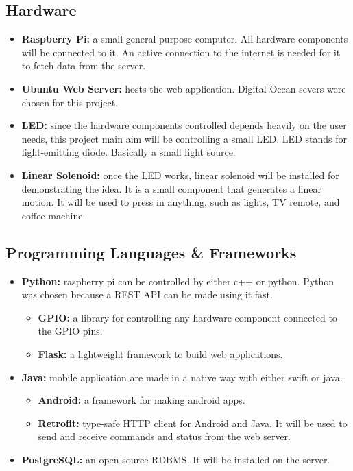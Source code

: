 \documentclass[12pt, oneside, a4paper]{book}
\newcommand\boldcolor[1]{\textcolor{bold}{\textbf{#1}}}
\begin{document}
			\subsection{Hardware}
				\begin{itemize}
				\item \boldcolor{Raspberry Pi:} a small general purpose computer. All hardware components will be connected to it. An active connection to the internet is needed for it to fetch data from the server. %
				\item \boldcolor{Ubuntu Web Server:} hosts the web application. Digital Ocean severs were chosen for this project.
				
				\item \boldcolor{LED:} since the hardware components controlled depends heavily on the user needs, this project main aim will be controlling a small LED. LED stands for light-emitting diode. Basically a small light source. %
				\item \boldcolor{Linear Solenoid:} once the LED works, linear solenoid will be installed for demonstrating the idea. It is a small component that generates a linear motion. It will be used to press in anything, such as lights, TV remote, and coffee machine. %
				\end{itemize}
				
			\subsection{Programming Languages \& Frameworks}
				\begin{itemize}
					
					\item \boldcolor{Python:} raspberry pi can be controlled by either c++ or python. Python was chosen because a REST API can be made using it fast.
		 				\begin{itemize}
		 					\item \textbf{GPIO:} a library for controlling any hardware component connected to the GPIO pins.
		 					\item \textbf{Flask:} a lightweight framework to build web applications.
						\end{itemize}
					\item \boldcolor{Java:} mobile application are made in a native way with either swift or java.
						\begin{itemize}
							\item \textbf{Android:} a framework for making android apps.
							\item \boldcolor{Retrofit:} type-safe HTTP client for Android and Java. It will be used to send and receive commands and status from the web server.
							
						\end{itemize}
					\item \boldcolor{PostgreSQL:} an open-source RDBMS. It will be installed on the server.
				\end{itemize}
			
\end{document}
